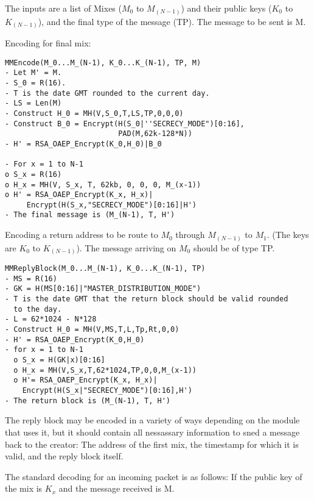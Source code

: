 \documentclass{article}
\begin{document}
The inputs are a list of Mixes ($M_0$ to $M_(N-1)$) and their public
keys ($K_0$ to $K_(N-1)$), and the final type of the message (TP). The
message to be sent is M.

Encoding for final mix: 

\begin{verbatim}
MMEncode(M_0...M_(N-1), K_0...K_(N-1), TP, M)
- Let M' = M.
- S_0 = R(16).
- T is the date GMT rounded to the current day.
- LS = Len(M)
- Construct H_0 = MH(V,S_0,T,LS,TP,0,0,0)
- Construct B_0 = Encrypt(H(S_0|''SECRECY_MODE")[0:16],
                          PAD(M,62k-128*N))
- H' = RSA_OAEP_Encrypt(K_0,H_0)|B_0

- For x = 1 to N-1
o S_x = R(16)
o H_x = MH(V, S_x, T, 62kb, 0, 0, 0, M_(x-1))
o H' = RSA_OAEP_Encrypt(K_x, H_x)|
     Encrypt(H(S_x,"SECRECY_MODE")[0:16]|H')
- The final message is (M_(N-1), T, H')
\end{verbatim}

Encoding a return address to be route to $M_0$ through $M_(N-1)$ to
$M_1$. (The keys are $K_0$ to $K_(N-1)$). The message arriving on $M_0$
should be of type TP.

\begin{verbatim}
MMReplyBlock(M_0...M_(N-1), K_0...K_(N-1), TP)
- MS = R(16)
- GK = H(MS[0:16]|"MASTER_DISTRIBUTION_MODE")
- T is the date GMT that the return block should be valid rounded
  to the day. 
- L = 62*1024 - N*128
- Construct H_0 = MH(V,MS,T,L,Tp,Rt,0,0)
- H' = RSA_OAEP_Encrypt(K_0,H_0)
- for x = 1 to N-1
  o S_x = H(GK|x)[0:16]
  o H_x = MH(V,S_x,T,62*1024,TP,0,0,M_(x-1))
  o H'= RSA_OAEP_Encrypt(K_x, H_x)| 
    Encrypt(H(S_x|"SECRECY_MODE")[0:16],H')
- The return block is (M_(N-1), T, H')
\end{verbatim}

The reply block may be encoded in a variety of ways depending on the
module that uses it, but it should contain all nessassary information
to sned a message back to the creator: The address of the first mix,
the timestamp for which it is valid, and the reply block itself.

The standard decoding for an incoming packet is as follows:
If the public key of the mix is $K_x$ and the message received is M.
\end{document}
